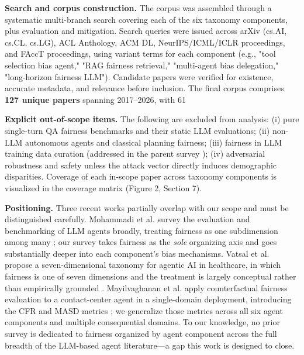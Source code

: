 \documentclass[sigconf,nonacm]{acmart}
\begin{document}
\textbf{Search and corpus construction.} The corpus was assembled through a systematic multi-branch search covering each of the six taxonomy components, plus evaluation and mitigation. Search queries were issued across arXiv (cs.AI, cs.CL, cs.LG), ACL Anthology, ACM DL, NeurIPS/ICML/ICLR proceedings, and FAccT proceedings, using variant terms for each component (e.g., "tool selection bias agent," "RAG fairness retrieval," "multi-agent bias delegation," "long-horizon fairness LLM"). Candidate papers were verified for existence, accurate metadata, and relevance before inclusion. The final corpus comprises \textbf{127 unique papers} spanning 2017–2026, with 61%

\textbf{Explicit out-of-scope items.} The following are excluded from analysis: (i) pure single-turn QA fairness benchmarks and their static LLM evaluations; (ii) non-LLM autonomous agents and classical planning fairness; (iii) fairness in LLM training data curation (addressed in the parent survey \cite{chu2024fairness}); (iv) adversarial robustness and safety unless the attack vector directly induces demographic disparities. Coverage of each in-scope paper across taxonomy components is visualized in the coverage matrix (Figure 2, Section 7).

\textbf{Positioning.} Three recent works partially overlap with our scope and must be distinguished carefully. Mohammadi et al. survey the evaluation and benchmarking of LLM agents broadly, treating fairness as one subdimension among many \cite{mohammadi2025evaluation}; our survey takes fairness as the \emph{sole} organizing axis and goes substantially deeper into each component's bias mechanisms. Vatsal et al. propose a seven-dimensional taxonomy for agentic AI in healthcare, in which fairness is one of seven dimensions and the treatment is largely conceptual rather than empirically grounded \cite{vatsal2026agentic}. Mayilvaghanan et al. apply counterfactual fairness evaluation to a contact-center agent in a single-domain deployment, introducing the CFR and MASD metrics \cite{mayilvaghanan2026counterfactual}; we generalize those metrics across all six agent components and multiple consequential domains. To our knowledge, no prior survey is dedicated to fairness organized by agent component across the full breadth of the LLM-based agent literature—a gap this work is designed to close.
\end{document}
